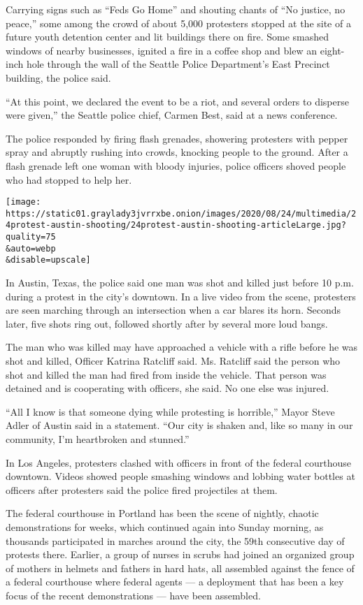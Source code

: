 Carrying signs such as ``Feds Go Home'' and shouting chants of ``No
justice, no peace,'' some among the crowd of about 5,000 protesters
stopped at the site of a future youth detention center and lit buildings
there on fire. Some smashed windows of nearby businesses, ignited a fire
in a coffee shop and blew an eight-inch hole through the wall of the
Seattle Police Department's East Precinct building, the police said.

``At this point, we declared the event to be a riot, and several orders
to disperse were given,'' the Seattle police chief, Carmen Best, said at
a news conference.

The police responded by firing flash grenades, showering protesters with
pepper spray and abruptly rushing into crowds, knocking people to the
ground. After a flash grenade left one woman with bloody injuries,
police officers shoved people who had stopped to help her.

\texttt{[image: https://static01.graylady3jvrrxbe.onion/images/2020/08/24/multimedia/24protest-austin-shooting/24protest-austin-shooting-articleLarge.jpg?quality=75\\\&auto=webp\\\&disable=upscale]}

In Austin, Texas, the police said one man was shot and killed just
before 10 p.m. during a protest in the city's downtown. In a live video
from the scene, protesters are seen marching through an intersection
when a car blares its horn. Seconds later, five shots ring out, followed
shortly after by several more loud bangs.

The man who was killed may have approached a vehicle with a rifle before
he was shot and killed, Officer Katrina Ratcliff said. Ms. Ratcliff said
the person who shot and killed the man had fired from inside the
vehicle. That person was detained and is cooperating with officers, she
said. No one else was injured.

``All I know is that someone dying while protesting is horrible,'' Mayor
Steve Adler of Austin said in a statement. ``Our city is shaken and,
like so many in our community, I'm heartbroken and stunned.''

In Los Angeles, protesters clashed with officers in front of the federal
courthouse downtown. Videos showed people smashing windows and lobbing
water bottles at officers after protesters said the police fired
projectiles at them.

The federal courthouse in Portland has been the scene of nightly,
chaotic demonstrations for weeks, which continued again into Sunday
morning, as thousands participated in marches around the city, the 59th
consecutive day of protests there. Earlier, a group of nurses in scrubs
had joined an organized group of mothers in helmets and fathers in hard
hats, all assembled against the fence of a federal courthouse where
federal agents --- a deployment that has been a key focus of the recent
demonstrations --- have been assembled.

